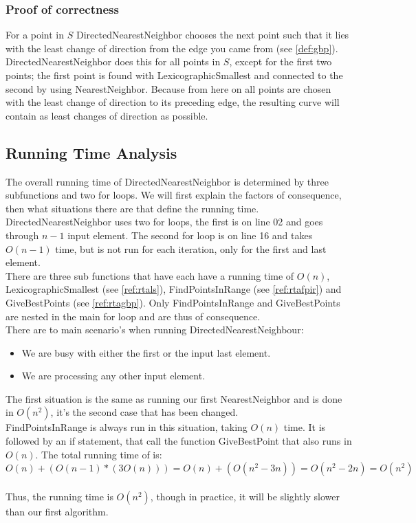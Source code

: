     \subsubsection{Proof of correctness}
    \label{ssub:proof}
      For a point in $S$ DirectedNearestNeighbor chooses the next point such that it lies with the least change of direction from the edge you came from (see \ref{def:gbp}). DirectedNearestNeighbor does this for all points in $S$, except for the first two points; the first point is found with LexicographicSmallest and connected to the second by using NearestNeighbor. Because from here on all points are chosen with the least change of direction to its preceding edge, the resulting curve will contain as least changes of direction as possible.

    \subsection{Running Time Analysis}
    \label{sub:running_time_analysis}
       The overall running time of DirectedNearestNeighbor is determined by three subfunctions and two for loops. We will first explain the factors of consequence, then what situations there are that define the running time.
        DirectedNearestNeighbor uses two for loops, the first is on line 02 and goes through $n-1$ input element. The second for loop is on line 16 and takes $O(n-1)$ time, but is not run for each iteration, only for the first and last element. \\
        There are three sub functions that have each have a running time of $O(n)$, LexicographicSmallest (see \ref{ref:rtals}), FindPointsInRange (see \ref{ref:rtafpir}) and GiveBestPoints (see \ref{ref:rtagbp}). Only FindPointsInRange and GiveBestPoints are nested in the main for loop and are thus of consequence.\\
        There are to main scenario's when running DirectedNearestNeighbour:
        \begin{itemize}
          \item We are busy with either the first or the input last element.
          \item We are processing any other input element.
        \end{itemize}

         The first situation is the same as running our first NearestNeighbor and is done in $O(n^{2})$, it's the second case that has been changed.\\
         FindPointsInRange is always run in this situation, taking $O(n)$ time. It is followed by an if statement, that call the function GiveBestPoint that also runs in $O(n)$. The total running time of is: \\
             $O(n) + (O(n-1)*(3O(n))) = O(n) + ( O(n^{2}-3n) ) = O(n^{2} -2n) = O(n^{2})$ \\ \\
          Thus, the running time is $O(n^{2})$, though in practice, it will be slightly slower than our first algorithm.

